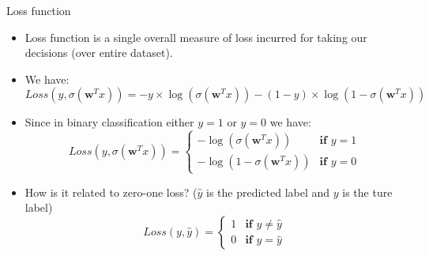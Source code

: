 \documentclass[serif, aspectratio=169]{beamer}
\begin{document}

\begin{frame}{Loss function}
    \begin{itemize}
        \item Loss function is a single overall measure of loss incurred for taking our decisions (over entire dataset).
        \item We have:
        \[ Loss(y, \sigma (\mathbf{w}^T x)) = -y \times \log (\sigma ( \mathbf{w}^T x)) - (1-y) \times \log 
        (1 - \sigma (\mathbf{w}^T x))
        \]
        
        \item Since in binary classification either $y=1$ or $y=0$ we have:
            \[
                Loss(y, \sigma (\mathbf{w}^T x)) = \begin{cases}
                    - \log (\sigma (\mathbf{w}^T x)) & \textbf{if } y = 1 \\
                    - \log (1 - \sigma (\mathbf{w}^T x)) & \textbf{if } y = 0
                \end{cases}
            \]
        \item How is it related to zero-one loss? ($\hat{y}$ is the predicted label and $y$ is the ture label)
           \[
               Loss(y, \hat{y}) =  \begin{cases}
                    1 & \textbf{if } y \neq \hat{y} \\
                    0 & \textbf{if } y = \hat{y}
                \end{cases}
            \]
    \end{itemize}
\end{frame}


\end{document}
